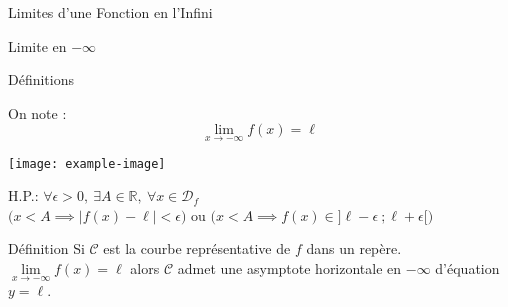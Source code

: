 \documentclass{cours}
\begin{document}
\begin{Gpartie}{Limites d'une Fonction en l'Infini}
\begin{Spartie}{Limite en $-\infty$}
\begin{SSpartie}{Définitions}
\begin{itemize}
                    On note : \[\lim\limits_{x\to-\infty}f(x)=\ell\]
                    \begin{center}
                            \texttt{[image: example-image]}
                        \parbox{\linewidth}{}
                    \end{center}
                    \vspace*{2ex}
                    H.P.: $\forall\epsilon >0,~\exists A\in\mathbb{R},~\forall x\in\mathcal{D}_f$ \\ \phantom{H.P.: }$\bigg(x<A\implies\left\lvert f(x)-\ell\right\rvert <\epsilon\bigg)$ ou $\bigg(x<A\implies f(x)\in\big]\ell-\epsilon~;\ell+\epsilon\big[\bigg)$
                \end{itemize}
            \end{SSpartie}
            \begin{SSpartie}{Définition} 
                Si $\mathcal{C}$ est la courbe représentative de $f$ dans un repère. $\lim\limits_{x\to-\infty}f(x)=\ell$ alors $\mathcal{C}$ admet une asymptote horizontale en $-\infty$ d'équation $y=\ell$.
            \end{SSpartie}
        \end{Spartie}
    \end{Gpartie}
    \pagebreak
\end{document}

